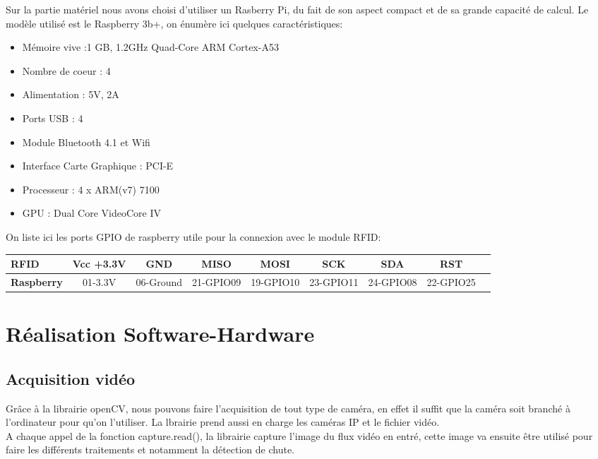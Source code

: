\documentclass[a4paper]{report}
\begin{document}
    Sur la partie matériel nous avons choisi d'utiliser un Rasberry Pi, du fait de son aspect compact et 
    de sa grande capacité de calcul. Le modèle utilisé est le Raspberry 3b+, on énumère ici quelques
    caractéristiques:
        \begin{itemize}
            \item Mémoire vive :1 GB, 1.2GHz Quad-Core ARM Cortex-A53
            \item Nombre de coeur : 4
            \item Alimentation : 5V, 2A
            \item Ports USB : 4
            \item Module Bluetooth 4.1 et Wifi
            \item Interface Carte Graphique : PCI-E
            \item Processeur : 4 x ARM(v7) 7100
            \item GPU : Dual Core VideoCore IV \newline
        \end{itemize}
    On liste ici les ports GPIO de raspberry utile pour la connexion avec le module RFID:\newline
        \begin{tabular}{||p{2cm}||*{8}{c|}|}
            \hline
            \small{RFID} & \small{Vcc +3.3V} & \small{GND} & \small{MISO} 
            & \small{MOSI} & \small{SCK} & \small{SDA} & \small{RST} \\
            \hline
            \bfseries \small{Raspberry} & \small{01-3.3V} & \small{06-Ground} 
            & \small{21-GPIO09} & \small{19-GPIO10} & \small{23-GPIO11} 
            & \small{24-GPIO08} & \small{22-GPIO25} \\
            \hline
            \end{tabular}\newline
            
            
            
    
    \chapter{Réalisation Software-Hardware}
        \section{Acquisition vidéo}
            Grâce à la librairie openCV, nous pouvons faire l'acquisition de tout type de caméra, en effet il suffit que la caméra soit branché à l'ordinateur pour qu'on l'utiliser. La lbrairie prend aussi en charge les caméras IP et le fichier vidéo.
            \\
            A chaque appel de la fonction capture.read(), la librairie capture l'image du flux vidéo en entré, cette image va ensuite être utilisé pour faire les différents traitements et notamment la détection de chute.
\end{document}
